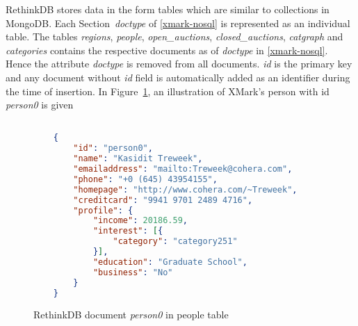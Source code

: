 RethinkDB stores data in the form tables which are similar to collections in MongoDB.  Each Section~\textit{doctype} of \ref{xmark-nosql} is represented as an individual table. The tables \textit{regions}, \textit{people}, \textit{open\_auctions}, \textit{closed\_auctions}, \textit{catgraph} and \textit{categories} contains the respective documents as of \textit{doctype} in \ref{xmark-nosql}. Hence the attribute \textit{doctype} is removed from all documents.  \textit{id} is the primary key and any document without \textit{id} field is automatically added as an identifier during the time of insertion. In Figure~\ref{code:rethindb-person0}, an illustration of XMark's person with id \textit{person0} is given
\begin{figure}
\centering
\begin{lstlisting}[language=JSON,basicstyle =\scriptsize]

	{
		"id": "person0",
		"name": "Kasidit Treweek",
		"emailaddress": "mailto:Treweek@cohera.com",
		"phone": "+0 (645) 43954155",
		"homepage": "http://www.cohera.com/~Treweek",
		"creditcard": "9941 9701 2489 4716",
		"profile": {
			"income": 20186.59,
			"interest": [{
				"category": "category251"
			}],
			"education": "Graduate School",
			"business": "No"
		}
	}
\end{lstlisting}
\caption{RethinkDB document \textit{person0} in people table}
\label{code:rethindb-person0}
\end{figure}